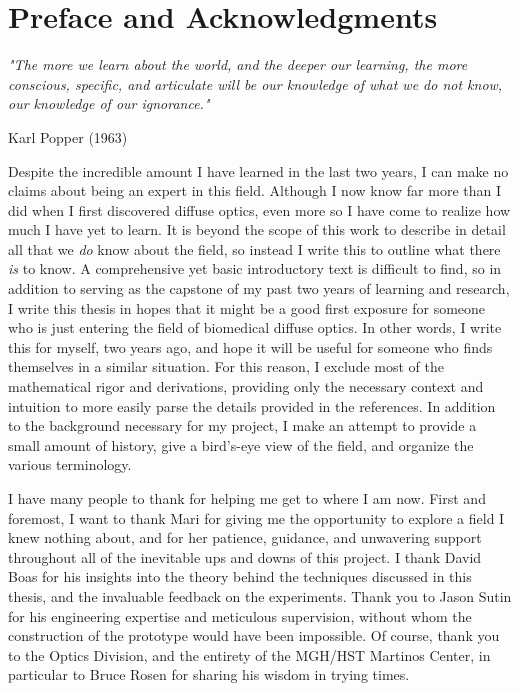 \section*{Preface and Acknowledgments}
\epigraph{\textit{"The more we learn about the world, and the deeper our learning, the more conscious, specific, and articulate will be our knowledge of what we do not know, our knowledge of our ignorance."}}{Karl Popper (1963)}

Despite the incredible amount I have learned in the last two years, I can make no claims about being an expert in this field. Although I now know far more than I did when I first discovered diffuse optics, even more so I have come to realize how much I have yet to learn. It is beyond the scope of this work to describe in detail all that we \emph{do} know about the field, so instead I write this to outline what there \emph{is} to know. A comprehensive yet basic introductory text is difficult to find, so in addition to serving as the capstone of my past two years of learning and research, I write this thesis in hopes that it might be a good first exposure for someone who is just entering the field of biomedical diffuse optics. In other words, I write this for myself, two years ago, and hope it will be useful for someone who finds themselves in a similar situation. For this reason, I exclude most of the mathematical rigor and derivations, providing only the necessary context and intuition to more easily parse the details provided in the references. In addition to the background necessary for my project, I make an attempt to provide a small amount of history, give a bird's-eye view of the field, and organize the various terminology.  


I have many people to thank for helping me get to where I am now. First and foremost, I want to thank Mari for giving me the opportunity to explore a field I knew nothing about, and for her patience, guidance, and unwavering support throughout all of the inevitable ups and downs of this project. I thank David Boas for his insights into the theory behind the techniques discussed in this thesis, and the invaluable feedback on the experiments. Thank you to Jason Sutin for his engineering expertise and meticulous supervision, without whom the construction of the prototype would have been impossible. Of course, thank you to the Optics Division, and the entirety of the MGH/HST Martinos Center, in particular to Bruce Rosen for sharing his wisdom in trying times.
 
